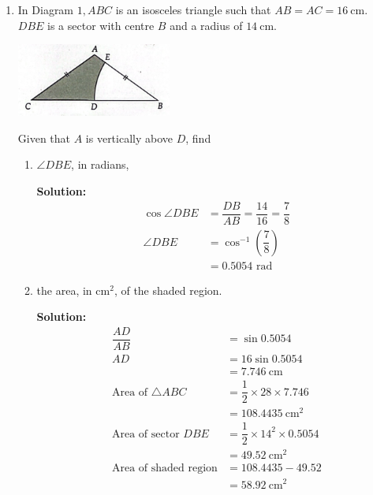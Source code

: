 \documentclass{report}
\newcommand{\sol}{\textbf{Solution:}}
\begin{document}
\begin{enumerate}[leftmargin=*]
    \item In Diagram $1, A B C$ is an isosceles triangle such that $A B=A C=16
              \mathrm{~cm}$. $D B E$ is a sector with centre $B$ and a radius of $14
              \mathrm{~cm}$.

          \begin{center}
              \includegraphics[width=0.4\textwidth]{./assets/p1.5.png}
          \end{center}

          Given that $A$ is vertically above $D$, find
          \begin{enumerate}
              \item $\angle D B E$, in radians,

                    \sol{}
                    \begin{align*}
                        \cos \angle D B E & = \dfrac{DB}{AB} = \dfrac{14}{16} = \dfrac{7}{8} \\
                        \angle D B E      & = \cos^{-1}\left(\dfrac{7}{8}\right)             \\
                                          & = 0.5054 \text{ rad}
                    \end{align*}

              \item the area, in $\mathrm{cm}^2$, of the shaded region.

                    \sol{}
                    \begin{align*}
                        \dfrac{AD}{AB}                 & = \sin 0.5054                            \\
                        AD                             & = 16 \sin 0.5054                         \\
                                                       & = 7.746 \mathrm{~cm}                     \\
                        \text{Area of $\triangle ABC$} & = \dfrac{1}{2} \times 28 \times 7.746    \\
                                                       & = 108.4435\mathrm{~cm}^2                 \\
                        \text{Area of sector $DBE$}    & = \dfrac{1}{2} \times 14^2 \times 0.5054 \\
                                                       & = 49.52 \mathrm{~cm}^2                   \\
                        \text{Area of shaded region}   & = 108.4435-49.52                         \\
                                                       & = 58.92\mathrm{~cm}^2
                    \end{align*}
          \end{enumerate}


\end{enumerate}
\end{document}
